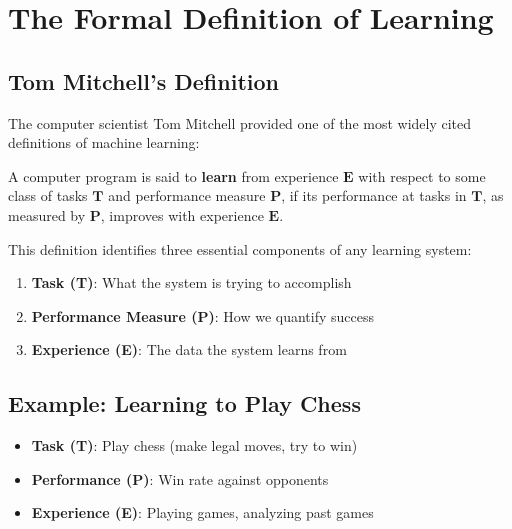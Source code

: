 
\section{The Formal Definition of Learning}

\subsection{Tom Mitchell's Definition}

The computer scientist Tom Mitchell provided one of the most widely cited definitions of machine learning:

\begin{theorembox}
A computer program is said to \textbf{learn} from experience $\mathbf{E}$ with respect to some class of tasks $\mathbf{T}$ and performance measure $\mathbf{P}$, if its performance at tasks in $\mathbf{T}$, as measured by $\mathbf{P}$, improves with experience $\mathbf{E}$.
\end{theorembox}

This definition identifies three essential components of any learning system:

\begin{enumerate}
    \item \textbf{Task (T)}: What the system is trying to accomplish
    \item \textbf{Performance Measure (P)}: How we quantify success
    \item \textbf{Experience (E)}: The data the system learns from
\end{enumerate}

\subsection{Example: Learning to Play Chess}

\begin{itemize}
    \item \textbf{Task (T)}: Play chess (make legal moves, try to win)
    \item \textbf{Performance (P)}: Win rate against opponents
    \item \textbf{Experience (E)}: Playing games, analyzing past games
\end{itemize}


